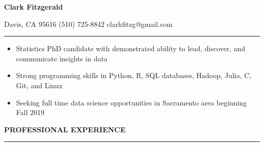 \documentclass{article}
\begin{document}
\begin{center}
{\Large\bf Clark Fitzgerald} 
\end{center}

\hspace{4cm} Davis, CA 95616 \hspace{0.5cm} (510) 725-8842 \hspace{0.5cm} clarkfitzg@gmail.com 

\vspace{0.2cm}
\hrule
\vspace{0.2cm}

\begin{itemize}
  \setlength{\itemsep}{-1pt}

\item Statistics PhD candidate with demonstrated ability to lead, discover,
    and communicate insights in data
    
\item Strong programming skills in Python, R, SQL databases, Hadoop, Julia,
    C, Git, and Linux

\item Seeking full time data science opportunities in Sacramento area
    beginning Fall 2019

\end{itemize}

\vspace{0.1 cm}

\textbf{PROFESSIONAL EXPERIENCE}
\vspace{0.2 cm}
\hrule
\vspace{0.1cm}
\end{document}
